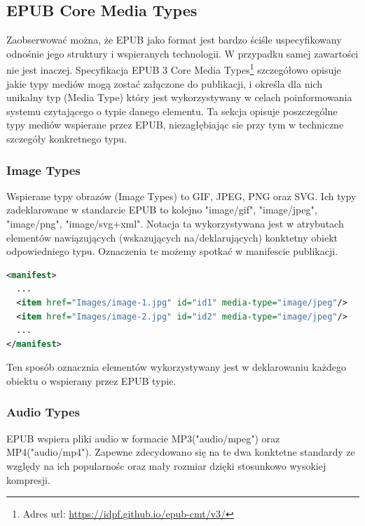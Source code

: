 \subsection{EPUB Core Media Types}

Zaobserwować można, że EPUB jako format jest bardzo ściśle uspecyfikowany odnośnie jego struktury i wspieranych technologii. W przypadku
samej zawartości nie jest inaczej. Specyfikacja EPUB 3 Core Media Types\footnote{Adres url: \href{https://idpf.github.io/epub-cmt/v3/}{https://idpf.github.io/epub-cmt/v3/}}
szczegółowo opisuje jakie typy mediów mogą zostać załączone do publikacji, i określa dla nich unikalny typ (Media Type) który jest
wykorzystywany w celach poinformowania systemu czytającego o typie danego elementu. Ta sekcja opisuje poszczególne typy mediów wspierane
przez EPUB, niezagłębiając sie przy tym w techniczne szczegóły konkretnego typu.

\subsubsection*{Image Types}

Wspierane typy obrazów (Image Types) to GIF, JPEG, PNG oraz SVG. Ich typy zadeklarowane w standarcie EPUB to kolejno "image/gif", "image/jpeg",
"image/png", "image/svg+xml". Notacja ta wykorzystywana jest w atrybutach elementów nawiązujących (wskazujących na/deklarujących) konktetny
obiekt odpowiedniego typu. Oznaczenia te możemy spotkać w manifescie publikacji.

\begin{lstlisting}[caption={Przykładowy fragment manifestu znajdującego się w pliku content.opf}, language=XML]
<manifest>
  ...
  <item href="Images/image-1.jpg" id="id1" media-type="image/jpeg"/>
  <item href="Images/image-2.jpg" id="id2" media-type="image/jpeg"/>
  ...
</manifest>
\end{lstlisting}

Ten sposób oznacznia elementów wykorzystywany jest w deklarowaniu każdego obiektu o wspierany przez EPUB typie.

\subsubsection*{Audio Types}

EPUB wspiera pliki audio w formacie MP3("audio/mpeg") oraz MP4("audio/mp4"). Zapewne zdecydowano się na te dwa konktetne standardy ze
względy na ich popularnośc oraz mały rozmiar dzięki stosunkowo wysokiej kompresji.


